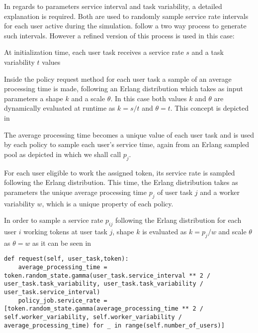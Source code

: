 In regards to parameters service interval and task variability, a detailed explanation is required. Both are used to randomly sample service rate intervals for each user active during the simulation. \citet[p. 8]{Zeng2005} follow a two way process to generate such intervals. However a refined version of this process is used in this case:
\begin{enumerate*}
	\item At initialization time, each user task receives a service rate $s$ and a task variability $t$ values
	\item Inside the policy request method for each user task a sample of an average processing time is made, following an Erlang distribution which takes as input parameters a shape $k$ and a scale $\theta$. In this case both values $k$ and $\theta$ are dynamically evaluated at runtime as $k=s/t$ and $\theta = t$. This concept is depicted in 
	\item The average processing time becomes a unique value of each user task and is used by each policy to sample each user's service time, again from an Erlang sampled pool as depicted in  which we shall call $p_j$.
\end{enumerate*}

For each user eligible to work the assigned token, its service rate is sampled following the Erlang distribution. This time, the Erlang distribution takes as parameters the unique average processing time $p_j$ of user task $j$ and a worker variability $w$, which is a unique property of each policy.

In order to sample a service rate $p_{ij}$ following the Erlang distribution for each user $i$ working tokens at user task $j$, shape $k$ is evaluated as $k=p_j/w$ and scale $\theta$ as $\theta = w$ as it can be seen in 

\begin{lstlisting}[caption={User service rate sampling following an Erlang distribution where initially the average processing time is sampled. Afterwards, for each user a service time is sampled yet again relying on the formerly sampled average processing time and is assigned as an array to the policy job.},label=lst:user_service_rate,style=CustomPython]
def request(self, user_task,token):
    average_processing_time = token.random_state.gamma(user_task.service_interval ** 2 / user_task.task_variability, user_task.task_variability / user_task.service_interval)
    policy_job.service_rate = [token.random_state.gamma(average_processing_time ** 2 / self.worker_variability, self.worker_variability / average_processing_time) for _ in range(self.number_of_users)]
\end{lstlisting}

